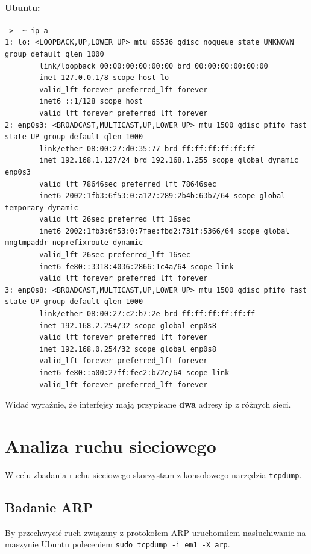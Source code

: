 \documentclass{mwart} %
\begin{document}
\paragraph{Ubuntu:}
\begin{verbatim}
->  ~ ip a 
1: lo: <LOOPBACK,UP,LOWER_UP> mtu 65536 qdisc noqueue state UNKNOWN group default qlen 1000
        link/loopback 00:00:00:00:00:00 brd 00:00:00:00:00:00
        inet 127.0.0.1/8 scope host lo
        valid_lft forever preferred_lft forever
        inet6 ::1/128 scope host
        valid_lft forever preferred_lft forever
2: enp0s3: <BROADCAST,MULTICAST,UP,LOWER_UP> mtu 1500 qdisc pfifo_fast state UP group default qlen 1000
        link/ether 08:00:27:d0:35:77 brd ff:ff:ff:ff:ff:ff
        inet 192.168.1.127/24 brd 192.168.1.255 scope global dynamic enp0s3
        valid_lft 78646sec preferred_lft 78646sec
        inet6 2002:1fb3:6f53:0:a127:289:2b4b:63b7/64 scope global temporary dynamic
        valid_lft 26sec preferred_lft 16sec
        inet6 2002:1fb3:6f53:0:7fae:fbd2:731f:5366/64 scope global mngtmpaddr noprefixroute dynamic
        valid_lft 26sec preferred_lft 16sec
        inet6 fe80::3318:4036:2866:1c4a/64 scope link
        valid_lft forever preferred_lft forever
3: enp0s8: <BROADCAST,MULTICAST,UP,LOWER_UP> mtu 1500 qdisc pfifo_fast state UP group default qlen 1000
        link/ether 08:00:27:c2:b7:2e brd ff:ff:ff:ff:ff:ff
        inet 192.168.2.254/32 scope global enp0s8
        valid_lft forever preferred_lft forever
        inet 192.168.0.254/32 scope global enp0s8
        valid_lft forever preferred_lft forever
        inet6 fe80::a00:27ff:fec2:b72e/64 scope link
        valid_lft forever preferred_lft forever
\end{verbatim}

Widać wyraźnie, że interfejsy mają przypisane \textbf{dwa} adresy ip z różnych sieci.

\section{Analiza ruchu sieciowego}
W celu zbadania ruchu sieciowego skorzystam z konsolowego narzędzia \texttt{tcpdump}.

\subsection{Badanie ARP}
By przechwycić ruch związany z protokołem ARP uruchomiłem nasłuchiwanie na maszynie Ubuntu poleceniem \texttt{sudo tcpdump -i em1 -X arp}.
\end{document}
